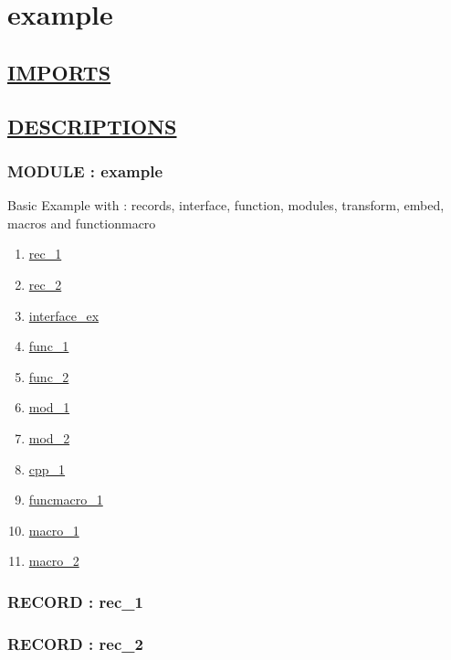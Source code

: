 \chapter*{example}

\section*{\underline{IMPORTS}}

\section*{\underline{DESCRIPTIONS}}
\subsection*{MODULE : example}
\hypertarget{ecldoc:example_example}{}
Basic Example with : records, interface, function, modules, transform, embed, macros and functionmacro \\
\begin{enumerate}
\item \hyperlink{ecldoc:example_example.rec_1}{rec\_1}
\item \hyperlink{ecldoc:example_example.rec_2}{rec\_2}
\item \hyperlink{ecldoc:example_example.interface_ex}{interface\_ex}
\item \hyperlink{ecldoc:example_example.func_1}{func\_1}
\item \hyperlink{ecldoc:example_example.func_2}{func\_2}
\item \hyperlink{ecldoc:example_example.mod_1}{mod\_1}
\item \hyperlink{ecldoc:example_example.mod_2}{mod\_2}
\item \hyperlink{ecldoc:example_example.cpp_1}{cpp\_1}
\item \hyperlink{ecldoc:example_example.funcmacro_1}{funcmacro\_1}
\item \hyperlink{ecldoc:example_example.macro_1}{macro\_1}
\item \hyperlink{ecldoc:example_example.macro_2}{macro\_2}
\end{enumerate}
\subsection*{RECORD : rec\_1}
\hypertarget{ecldoc:example_example.rec_1}{}
\subsection*{RECORD : rec\_2}
\hypertarget{ecldoc:example_example.rec_2}{}
